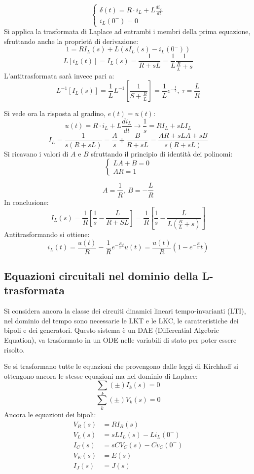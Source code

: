 $$
\begin{cases}
\delta(t) = R\cdot i_L + L\frac{di_L}{dt} \\
i_L(0^-) = 0
\end{cases}
$$
Si applica la trasformata di Laplace ad entrambi i membri della prima equazione, sfruttando anche
la proprietà di derivazione:
$$
1 = RI_L(s) + L(sI_L(s) - i_L(0^-))
$$
$$
L[i_L(t)] = I_L(s) = \frac{1}{R+sL} = \frac{1}{L}\frac{1}{\frac{R}{L}+s}
$$
L'antitrasformata sarà invece pari a:
$$
L^{-1}[I_L(s)] = \frac{1}{L} L^{-1}\left[\frac{1}{S+\frac{R}{L}}\right] = \frac{1}{L}e^{-\frac{t}{\tau}},\ 
\tau = \frac{L}{R}
$$

Si vede ora la risposta al gradino, $e(t) = u(t)$:
$$
u(t) = R\cdot i_L+ L\frac{di_L}{dt} \rightarrow \frac{1}{s} = RI_L + sLI_L 
$$
$$
I_L = \frac{1}{s(R+sL)} = \frac{A}{s} + \frac{B}{R+sL} = \frac{AR+sLA+sB}{s(R+sL)}
$$
Si ricavano i valori di $A$ e $B$ sfruttando il principio di identità dei polinomi:
$$\begin{cases}
LA+B = 0\\
AR = 1
\end{cases}$$

$$
A = \frac{1}{R},\ B = -\frac{L}{R}
$$
In conclusione:
$$
I_L(s) = \frac{1}{R}\left[\frac{1}{s}-\frac{L}{R+SL}\right] = \frac{1}{R}\left[\frac{1}{s}-
\frac{L}{L\left(\frac{R}{L}+s\right)}\right]
$$
Antitrasformando si ottiene:
$$
i_L(t) = \frac{u(t)}{R} - \frac{1}{R}e^{-\frac{R}{L}t}u(t) = \frac{u(t)}{R}\left(1-e^{-\frac{R}{L}}t\right)
$$

\subsection{Equazioni circuitali nel dominio della L-trasformata}
Si considera ancora la classe dei circuiti dinamici lineari tempo-invarianti (LTI),
nel dominio del tempo sono necessarie le LKT e le LKC, le caratteristiche dei bipoli e dei generatori.
Questo sistema è un DAE (Differential Algebric Equation), va trasformato in un ODE nelle variabili di stato per poter essere risolto.

Se si trasformano tutte le equazioni che provengono dalle leggi di Kirchhoff si ottengono ancora le stesse equazioni
ma nel dominio di Laplace:
$$
\sum_{k} (\pm)I_k(s) = 0
$$
$$
\sum_k (\pm)V_k(s) = 0
$$
Ancora le equazioni dei bipoli:
$$\begin{aligned}
V_R(s) &= RI_R(s)\\
V_L(s) &= sLI_L(s) - Li_L(0^-)\\
I_C(s) &= sCV_C(s) - Cv_C(0^-)\\
V_E(s) &= E(s)\\
I_J(s)&= J(s)
\end{aligned}$$

